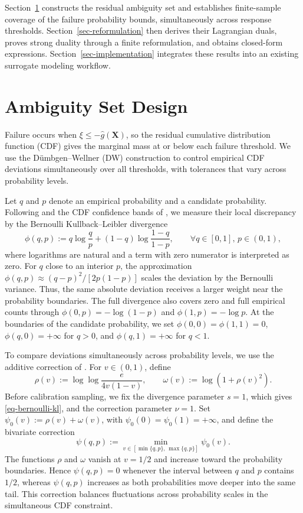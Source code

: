 \documentclass[review,11pt,3p,authoryear,nopreprintline]{elsarticle}
\begin{document}
Section~\ref{sec-ambiguity-set} constructs the residual ambiguity set and establishes finite-sample coverage of the failure probability bounds, simultaneously across response thresholds. Section~\ref{sec-reformulation} then derives their Lagrangian duals, proves strong duality through a finite reformulation, and obtains closed-form expressions. Section~\ref{sec-implementation} integrates these results into an existing surrogate modeling workflow.


\section{Ambiguity Set Design}
\label{sec-ambiguity-set}

Failure occurs when $\xi\le-\hat g(\bm X)$, so the residual cumulative distribution function (CDF) gives the marginal mass at or below each failure threshold. We use the D\"umbgen--Wellner (DW) construction \citep{L.J23} to control empirical CDF deviations simultaneously over all thresholds, with tolerances that vary across probability levels.

Let $q$ and $p$ denote an empirical probability and a candidate probability. Following \citet{B.J79} and the CDF confidence bands of \citet{O95}, we measure their local discrepancy by the Bernoulli Kullback--Leibler divergence
\begin{equation}
  \phi(q,p):=q\log\frac{q}{p}+(1-q)\log\frac{1-q}{1-p},\qquad \forall q\in[0,1],\, p\in(0,1),
  \label{eq-bernoulli-kl}
\end{equation}
where logarithms are natural and a term with zero numerator is interpreted as zero. For $q$ close to an interior $p$, the approximation $\phi(q,p)\approx(q-p)^2/[2p(1-p)]$ scales the deviation by the Bernoulli variance. Thus, the same absolute deviation receives a larger weight near the probability boundaries. The full divergence also covers zero and full empirical counts through $\phi(0,p)=-\log(1-p)$ and $\phi(1,p)=-\log p$. At the boundaries of the candidate probability, we set $\phi(0,0)=\phi(1,1)=0$, $\phi(q,0)=+\infty$ for $q>0$, and $\phi(q,1)=+\infty$ for $q<1$.

To compare deviations simultaneously across probability levels, we use the additive correction of \citet{L.J23}. For $v\in(0,1)$, define
\begin{equation*}
  \rho(v):=\log\log\frac{e}{4v(1-v)},\qquad \omega(v):=\log\!\left(1+\rho(v)^2\right).
\end{equation*}
Before calibration sampling, we fix the divergence parameter $s=1$, which gives \eqref{eq-bernoulli-kl}, and the correction parameter $\nu=1$. Set $\psi_0(v):=\rho(v)+\omega(v)$, with $\psi_0(0)=\psi_0(1)=+\infty$, and define the bivariate correction
\begin{equation*}
  \psi(q,p):=\min_{v\in[\min\{q,p\},\,\max\{q,p\}]}\psi_0(v).
\end{equation*}
The functions $\rho$ and $\omega$ vanish at $v=1/2$ and increase toward the probability boundaries. Hence $\psi(q,p)=0$ whenever the interval between $q$ and $p$ contains $1/2$, whereas $\psi(q,p)$ increases as both probabilities move deeper into the same tail. This correction balances fluctuations across probability scales in the simultaneous CDF constraint.
\end{document}

